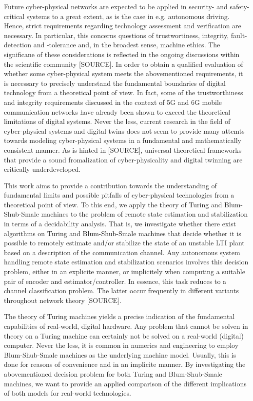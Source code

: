 \documentclass[conference]{IEEEtran}
\newcommand{\sdummy}{{\color{red}[SOURCE]}}
\begin{document}
	Future cyber-physical networks are expected to be applied in security- and safety-critical systems to a great extent, as is the case in e.g. autonomous driving.
	Hence, strict requirements regarding technology assessment and verification are necessary. In particular, this concerns questions of trustwortiness, integrity, 
	fault-detection and -tolerance and, in the broadest sense, machine ethics. The significane of these considerations is reflected in the ongoing discussions within the scientific community \sdummy. 
	In order to obtain a qualified evaluation of whether some cyber-physical system meets the abovementioned requirements, it is necessary to precisely understand 
	the fundamental boundaries of digital technology from a theoretical point of view. In fact, some of the trustworthiness and integrity requirements discussed in the context of 5G and 6G mobile
	communication networks have already been shown to exceed the theoretical limitations of digital systems. Never the less, current research in the field of cyber-physical systems and 
	digital twins does not seem to provide many attemts towards modeling cyber-physical systems in a fundamental and mathematically consistent manner. As is hinted in \sdummy, universal theoretical 
	frameworks that provide a sound fromalization of cyber-physicality and digital twinning are critically underdeveloped. 
	
	This work aims to provide a contribution towards the understanding of fundamental limits and possible pitfalls of cyber-physical technologies from a theoretical point of view.
	To this end, we apply the theory of Turing and Blum-Shub-Smale machines to the problem of remote state estimation and stabilization in terms of a decidability analysis. That is,
	we investigate whether there exist algorithms on Turing and Blum-Shub-Smale machines that decide whether it is possible to remotely estimate and/or stabilize the state of an unstable LTI plant
	based on a description of the communication channel. Any autonomous system handling remote state estimation and stabilization scenarios involves this decision problem, 
	either in an explicite manner, or implicitely when computing a suitable pair of encoder and estimator/controller.
	In essence, this task reduces to a channel classification problem. The latter occur frequently in different variants throughout network theory \sdummy.   
	
	The theory of Turing machines yields a precise indication of the fundamental capabilities of real-world, digital hardware. Any problem that cannot be solven in theory on a Turing machine
	can certainly not be solved on a real-world (digital) computer. Never the less, it is common in numerics and engineering to employ Blum-Shub-Smale machines as the underlying machine model.  
	Usually, this is done for reasons of convenience and in an implicite manner. By investigating the abovementioned decision problem for both Turing and Blum-Shub-Smale 
	machines, we want to provide an applied comparison of the different implications of both models for real-world technologies. 
	
\end{document}
